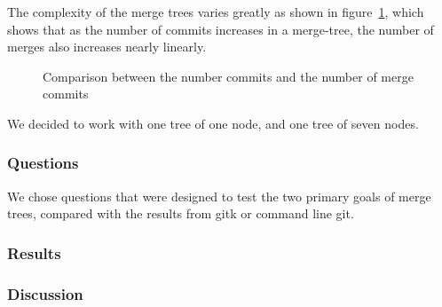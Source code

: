The complexity of the merge trees varies greatly as shown in
figure~\ref{fig:merge_vs_commits}, which shows that as the number of
commits increases in a merge-tree, the number of merges also increases
nearly linearly.

\begin{figure}[htpb]
  \centering
  \caption{Comparison between the number commits and the number of merge commits}
  \label{fig:merge_vs_commits}
\end{figure}


We decided to work with one tree of one node, and one tree of seven
nodes.

\subsubsection{Questions}
\label{ssub:questions}

We chose questions that were designed to test the two primary goals of
merge trees, compared with the results from gitk or command line git. 

\subsubsection{Results}
\label{ssub:results}

\subsubsection{Discussion}
\label{ssub:discussion}


